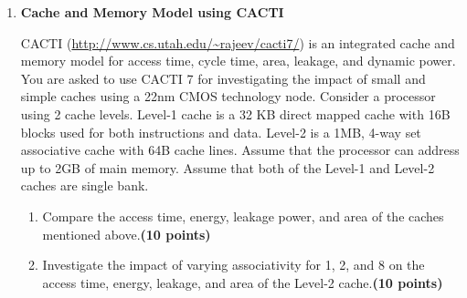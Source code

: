 \documentclass[a4paper, 11pt]{exam}
\begin{document}
\begin{enumerate}

\item \textbf{Cache and Memory Model using CACTI }

CACTI (\url{http://www.cs.utah.edu/~rajeev/cacti7/}) is an integrated cache and memory model for access time, cycle time, area, leakage, and dynamic power. You are asked to use CACTI 7 for investigating the impact of small and simple caches using a 22nm CMOS technology node. Consider a processor using 2 cache levels. Level-1 cache is a 32 KB direct mapped cache with 16B blocks used for both instructions and data. Level-2 is a 1MB, 4-way set associative cache with 64B cache lines. Assume that the processor can address up to 2GB of main memory. Assume that both of the Level-1 and Level-2 caches are single bank.
\begin{enumerate}
	\item Compare the access time, energy, leakage power, and area of the caches mentioned above.\textbf{(10 points)} 
    \item Investigate the impact of varying associativity for 1, 2, and 8 on the access time, energy, leakage, and area of the Level-2 cache.\textbf{(10 points)}

\end{enumerate}

\end{enumerate}
\end{document}
